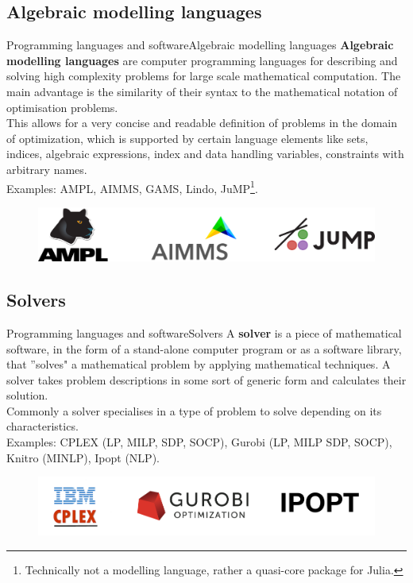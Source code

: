 \documentclass[handout]{beamer}
\begin{document}
\subsection{Algebraic modelling languages}
\begin{frame}[t]{Programming languages and software}{Algebraic modelling languages}
\textbf{Algebraic modelling languages} are computer programming languages for describing and solving high complexity problems for large scale mathematical computation. The main advantage is the similarity of their syntax to the mathematical notation of optimisation problems.\\[6pt]

This allows for a very concise and readable definition of problems in the domain of optimization, which is supported by certain language elements like sets, indices, algebraic expressions, index and data handling variables, constraints with arbitrary names.\\[6pt]

Examples: AMPL, AIMMS, GAMS, Lindo, JuMP\footnote[frame]{Technically not a modelling language, rather a quasi-core package for Julia.}.

\begin{figure}
\begin{center}
\includegraphics[width=.50\textwidth]{AML.png}
\end{center}
\end{figure}


\end{frame}

\subsection{Solvers}
\begin{frame}{Programming languages and software}{Solvers}
A \textbf{solver} is a piece of mathematical software, in the form of a stand-alone computer program or as a software library, that ''solves" a mathematical problem by applying mathematical techniques. A solver takes problem descriptions in some sort of generic form and calculates their solution.\\[6pt]
Commonly a solver specialises in a type of problem to solve depending on its characteristics.\\[6pt]

Examples: CPLEX (LP, MILP, SDP, SOCP), Gurobi (LP, MILP SDP, SOCP), Knitro (MINLP), Ipopt (NLP).

\begin{figure}
\begin{center}
\includegraphics[width=.75\textwidth]{Solvers.png}
\end{center}
\end{figure}



\end{frame}
\end{document}
